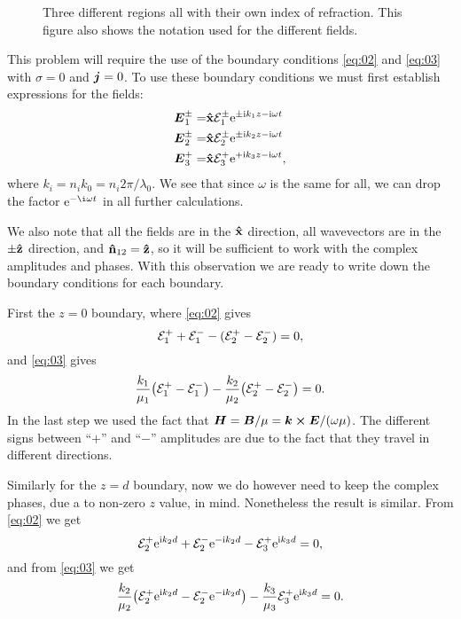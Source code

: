 \documentclass[11pt,letter, swedish, english
]{article}
\begin{document}
\begin{figure}
\centering
\resizebox{.6\textwidth}{!}{}
\caption{Three different regions all with their own index of
  refraction. This figure also shows the notation used for the
  different fields. }
\label{fig:1_geometry}
\end{figure}

This problem will require the use of the boundary conditions
\eqref{eq:02} and \eqref{eq:03} with $\sigma=0$ and $\vb*j=0$. To use
these boundary conditions we must first establish expressions for the
fields:
\begin{equation}
\begin{aligned}
\vb*E_1^\pm=&\vu{x}\mathcal{E}_1^\pm\mathrm{e}^{\pm\mathrm{i} k_1z -\mathrm{i}\omega t}\\
\vb*E_2^\pm=&\vu{x}\mathcal{E}_2^\pm\mathrm{e}^{\pm\mathrm{i} k_2z -\mathrm{i}\omega t}\\
\vb*E_3^{+}=&\vu{x}\mathcal{E}_3^+\mathrm{e}^{+\mathrm{i} k_3z -\mathrm{i}\omega t},
\end{aligned}
\end{equation}
where $k_i=n_ik_0=n_i2\pi/\lambda_0$. We see that since $\omega$
is the same for all, we can drop the factor $\ee^{-\i\omega t}$ in all
further calculations. 

We also note that all the fields are in the $\vu{x}$ direction, all
wavevectors are in the $\pm\vu{z}$ direction, and
$\vu{n}_{12}=\vu{z}$, so it will be sufficient to work with the
complex amplitudes and phases. With this observation we are ready to
write down the boundary conditions for each boundary. 

First the $z=0$ boundary, where \eqref{eq:02} gives
\begin{equation}
{\mathcal{E}_1^+}+{\mathcal{E}_1^-} -({\mathcal{E}_2^+}-{\mathcal{E}_2^-}) =0, 
\end{equation}
and \eqref{eq:03} gives
\begin{equation}
\frac{k_1}{\mu_1}\qty({\mathcal{E}_1^+}-{\mathcal{E}_1^-}) 
-\frac{k_2}{\mu_2}\qty({\mathcal{E}_2^+}-{\mathcal{E}_2^-}) =0.
\end{equation}
In the last step we used the fact that 
$\vb*H = \vb*B/\mu = \vb*k\cross\vb*E/(\omega\mu)$. The different
signs between ``$+$'' and ``$-$'' amplitudes are due to the fact that
they travel in different directions. 

Similarly for the $z=d$ boundary, now we do however need to keep the
complex phases, due a to non-zero $z$ value, in mind. Nonetheless the
result is similar. From \eqref{eq:02} we get
\begin{equation}
{\mathcal{E}_2^+}\mathrm{e}^{\mathrm{i} k_2d}+{\mathcal{E}_2^-}\mathrm{e}^{-\mathrm{i} k_2d} -{\mathcal{E}_3^+}\mathrm{e}^{\mathrm{i} k_3d} =0, 
\end{equation}
and from \eqref{eq:03} we get
\begin{equation}
\frac{k_2}{\mu_2}\qty({\mathcal{E}_2^+}\mathrm{e}^{\mathrm{i} k_2d}-{\mathcal{E}_2^-}\mathrm{e}^{-\mathrm{i} k_2d}) 
-\frac{k_3}{\mu_3}{\mathcal{E}_3^+}\mathrm{e}^{\mathrm{i} k_3d} =0.
\end{equation}
\end{document}
